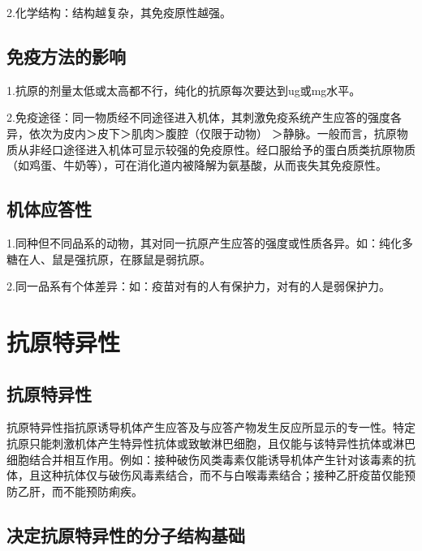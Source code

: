 2.化学结构：结构越复杂，其免疫原性越强。


\subsection{免疫方法的影响}

1.抗原的剂量太低或太高都不行，纯化的抗原每次要达到ug或mg水平。

2.免疫途径：同一物质经不同途径进入机体，其刺激免疫系统产生应答的强度各异，依次为皮内＞皮下＞肌肉＞腹腔（仅限于动物）
＞静脉。一般而言，抗原物质从非经口途径进入机体可显示较强的免疫原性。经口服给予的蛋白质类抗原物质（如鸡蛋、牛奶等），可在消化道内被降解为氨基酸，从而丧失其免疫原性。


\subsection{机体应答性}

1.同种但不同品系的动物，其对同一抗原产生应答的强度或性质各异。如：纯化多糖在人、鼠是强抗原，在豚鼠是弱抗原。

2.同一品系有个体差异：如：疫苗对有的人有保护力，对有的人是弱保护力。

\section{抗原特异性}


\subsection{抗原特异性}

抗原特异性指抗原诱导机体产生应答及与应答产物发生反应所显示的专一性。特定抗原只能刺激机体产生特异性抗体或致敏淋巴细胞，且仅能与该特异性抗体或淋巴细胞结合并相互作用。例如：接种破伤风类毒素仅能诱导机体产生针对该毒素的抗体，且这种抗体仅与破伤风毒素结合，而不与白喉毒素结合；接种乙肝疫苗仅能预防乙肝，而不能预防痢疾。


\subsection{决定抗原特异性的分子结构基础}

